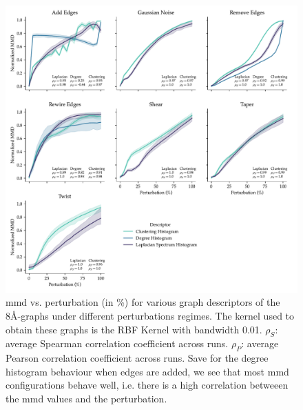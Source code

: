 \begin{figure}
  \centering
  \includegraphics[width=\textwidth]{./figures/results/res_1_1.pdf}
  \caption[Overall behaviour of \acrshort{mmd} using graph-based descriptors.]{\acrshort{mmd} vs.
perturbation (in \%) for various graph descriptors of the 8\si{\angstrom}-graphs
under different perturbations regimes. The kernel used to obtain these graphs is
the RBF Kernel with bandwidth 0.01. $\rho_{S}$: average Spearman correlation
coefficient across runs. $\rho_{P}$: average Pearson correlation coefficient
across runs. Save for the degree histogram behaviour when edges are added, we
see that most \acrshort{mmd} configurations behave well, i.e. there is a high correlation
betweeen the \acrshort{mmd} values and the perturbation.}
  \label{fig:mmd_consistent_eps}
\end{figure}


